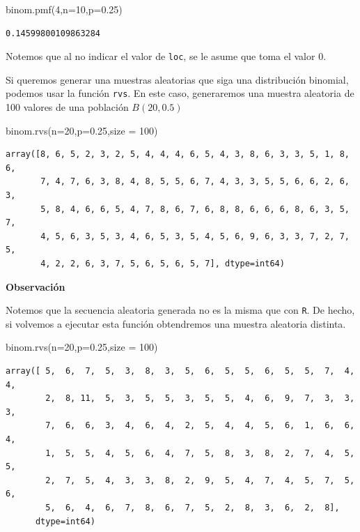 \documentclass[
  letterpaper,
  DIV=11,
  numbers=noendperiod]{scrreprt}
\newenvironment{Shaded}{\begin{snugshade}}{\end{snugshade}}
\newcommand{\DecValTok}[1]{\textcolor[rgb]{0.68,0.00,0.00}{#1}}
\newcommand{\FloatTok}[1]{\textcolor[rgb]{0.68,0.00,0.00}{#1}}
\newcommand{\NormalTok}[1]{\textcolor[rgb]{0.00,0.23,0.31}{#1}}
\newcommand{\OperatorTok}[1]{\textcolor[rgb]{0.37,0.37,0.37}{#1}}
\begin{document}
\begin{Shaded}
\begin{Highlighting}[]
\NormalTok{binom.pmf(}\DecValTok{4}\NormalTok{,n}\OperatorTok{=}\DecValTok{10}\NormalTok{,p}\OperatorTok{=}\FloatTok{0.25}\NormalTok{)}
\end{Highlighting}
\end{Shaded}

\begin{verbatim}
0.14599800109863284
\end{verbatim}

Notemos que al no indicar el valor de \texttt{loc}, se le asume que toma
el valor 0.

Si queremos generar una muestras aleatorias que siga una distribución
binomial, podemos usar la función \texttt{rvs}. En este caso,
generaremos una muestra aleatoria de 100 valores de una población
\(B(20,0.5)\)

\begin{Shaded}
\begin{Highlighting}[]
\NormalTok{binom.rvs(n}\OperatorTok{=}\DecValTok{20}\NormalTok{,p}\OperatorTok{=}\FloatTok{0.25}\NormalTok{,size }\OperatorTok{=} \DecValTok{100}\NormalTok{)}
\end{Highlighting}
\end{Shaded}

\begin{verbatim}
array([8, 6, 5, 2, 3, 2, 5, 4, 4, 4, 6, 5, 4, 3, 8, 6, 3, 3, 5, 1, 8, 6,
       7, 4, 7, 6, 3, 8, 4, 8, 5, 5, 6, 7, 4, 3, 3, 5, 5, 6, 6, 2, 6, 3,
       5, 8, 4, 6, 6, 5, 4, 7, 8, 6, 7, 6, 8, 8, 6, 6, 6, 8, 6, 3, 5, 7,
       4, 5, 6, 3, 5, 3, 4, 6, 5, 3, 5, 4, 5, 6, 9, 6, 3, 3, 7, 2, 7, 5,
       4, 2, 2, 6, 3, 7, 5, 6, 5, 6, 5, 7], dtype=int64)
\end{verbatim}

\textbf{Observación}

Notemos que la secuencia aleatoria generada no es la misma que con
\texttt{R}. De hecho, si volvemos a ejecutar esta función obtendremos
una muestra aleatoria distinta.

\begin{Shaded}
\begin{Highlighting}[]
\NormalTok{binom.rvs(n}\OperatorTok{=}\DecValTok{20}\NormalTok{,p}\OperatorTok{=}\FloatTok{0.25}\NormalTok{,size }\OperatorTok{=} \DecValTok{100}\NormalTok{)}
\end{Highlighting}
\end{Shaded}

\begin{verbatim}
array([ 5,  6,  7,  5,  3,  8,  3,  5,  6,  5,  5,  6,  5,  5,  7,  4,  4,
        2,  8, 11,  5,  3,  5,  5,  3,  5,  5,  4,  6,  9,  7,  3,  3,  3,
        7,  6,  6,  3,  4,  6,  4,  2,  5,  4,  4,  5,  6,  1,  6,  6,  4,
        1,  5,  5,  4,  5,  6,  4,  7,  5,  8,  3,  8,  2,  7,  4,  5,  5,
        2,  7,  5,  4,  3,  3,  8,  2,  9,  5,  4,  7,  4,  5,  7,  5,  6,
        5,  6,  4,  6,  7,  8,  6,  7,  5,  2,  8,  3,  6,  2,  8],
      dtype=int64)
\end{verbatim}
\end{document}
